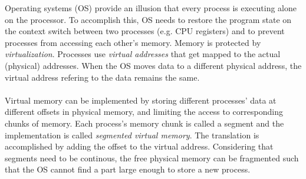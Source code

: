 Operating systems (OS) provide an illusion that every process is executing alone on the processor. 
To accomplish this, OS needs to restore the program state on the context switch between two processes (e.g. CPU registers)
and to prevent processes from accessing each other's memory. Memory is protected by \emph{virtualization}. Processes use \emph{virtual
addresses} that get mapped to the actual (physical) addresses. When the OS moves data to a different physical address, the virtual
address refering to the data remains the same.
\\
\\
Virtual memory can be implemented by storing different processes' data at different offsets in physical memory, and limiting the
access to corresponding chunks of memory. Each process's memory chunk is called a segment and the implementation is called
\emph{segmented virtual memory}. The translation is accomplished by adding the offset to the virtual address. 
Considering that segments need to be continous, the free physical memory can be fragmented
such that the OS cannot find a part large enough to store a new process.
\\
\\
